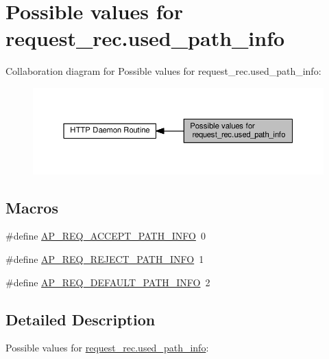 \hypertarget{group__values__request__rec__used__path__info}{}\section{Possible values for request\+\_\+rec.\+used\+\_\+path\+\_\+info}
\label{group__values__request__rec__used__path__info}
Collaboration diagram for Possible values for request\+\_\+rec.\+used\+\_\+path\+\_\+info\+:
\nopagebreak
\begin{figure}[H]
\begin{center}
\leavevmode
\includegraphics[width=350pt]{group__values__request__rec__used__path__info}
\end{center}
\end{figure}
\subsection*{Macros}
\begin{DoxyCompactItemize}
\item 
\#define \hyperlink{group__values__request__rec__used__path__info_ga670d14db97da000aafdf65d938de04c7}{A\+P\+\_\+\+R\+E\+Q\+\_\+\+A\+C\+C\+E\+P\+T\+\_\+\+P\+A\+T\+H\+\_\+\+I\+N\+FO}~0
\item 
\#define \hyperlink{group__values__request__rec__used__path__info_ga671b854d16c687f92e4e6be0db74cf08}{A\+P\+\_\+\+R\+E\+Q\+\_\+\+R\+E\+J\+E\+C\+T\+\_\+\+P\+A\+T\+H\+\_\+\+I\+N\+FO}~1
\item 
\#define \hyperlink{group__values__request__rec__used__path__info_ga0a636f7227021011d3fa0c2418b918fa}{A\+P\+\_\+\+R\+E\+Q\+\_\+\+D\+E\+F\+A\+U\+L\+T\+\_\+\+P\+A\+T\+H\+\_\+\+I\+N\+FO}~2
\end{DoxyCompactItemize}


\subsection{Detailed Description}
Possible values for \hyperlink{structrequest__rec_a5b463549b4dc27af708d9c577d1fc4c0}{request\+\_\+rec.\+used\+\_\+path\+\_\+info}\+: 

